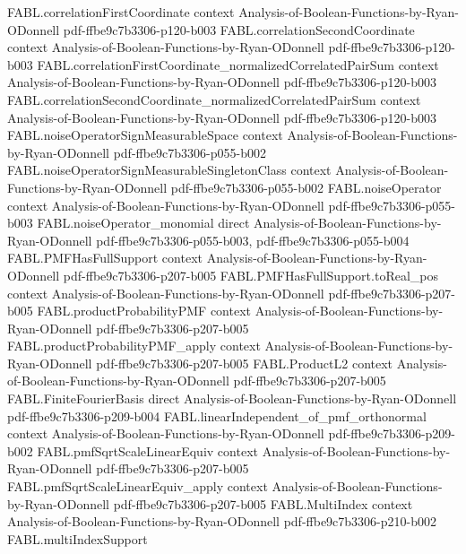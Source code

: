 \begin{theorem}
\proofstep
  {FABL.correlationFirstCoordinate}
  {context}
  {Analysis-of-Boolean-Functions-by-Ryan-ODonnell}
  {pdf-ffbe9c7b3306-p120-b003}
\proofstep
  {FABL.correlationSecondCoordinate}
  {context}
  {Analysis-of-Boolean-Functions-by-Ryan-ODonnell}
  {pdf-ffbe9c7b3306-p120-b003}
\proofstep
  {FABL.correlationFirstCoordinate_normalizedCorrelatedPairSum}
  {context}
  {Analysis-of-Boolean-Functions-by-Ryan-ODonnell}
  {pdf-ffbe9c7b3306-p120-b003}
\proofstep
  {FABL.correlationSecondCoordinate_normalizedCorrelatedPairSum}
  {context}
  {Analysis-of-Boolean-Functions-by-Ryan-ODonnell}
  {pdf-ffbe9c7b3306-p120-b003}
\proofstep
  {FABL.noiseOperatorSignMeasurableSpace}
  {context}
  {Analysis-of-Boolean-Functions-by-Ryan-ODonnell}
  {pdf-ffbe9c7b3306-p055-b002}
\proofstep
  {FABL.noiseOperatorSignMeasurableSingletonClass}
  {context}
  {Analysis-of-Boolean-Functions-by-Ryan-ODonnell}
  {pdf-ffbe9c7b3306-p055-b002}
\proofstep
  {FABL.noiseOperator}
  {context}
  {Analysis-of-Boolean-Functions-by-Ryan-ODonnell}
  {pdf-ffbe9c7b3306-p055-b003}
\proofstep
  {FABL.noiseOperator_monomial}
  {direct}
  {Analysis-of-Boolean-Functions-by-Ryan-ODonnell}
  {pdf-ffbe9c7b3306-p055-b003,
    pdf-ffbe9c7b3306-p055-b004}
\proofstep
  {FABL.PMFHasFullSupport}
  {context}
  {Analysis-of-Boolean-Functions-by-Ryan-ODonnell}
  {pdf-ffbe9c7b3306-p207-b005}
\proofstep
  {FABL.PMFHasFullSupport.toReal_pos}
  {context}
  {Analysis-of-Boolean-Functions-by-Ryan-ODonnell}
  {pdf-ffbe9c7b3306-p207-b005}
\proofstep
  {FABL.productProbabilityPMF}
  {context}
  {Analysis-of-Boolean-Functions-by-Ryan-ODonnell}
  {pdf-ffbe9c7b3306-p207-b005}
\proofstep
  {FABL.productProbabilityPMF_apply}
  {context}
  {Analysis-of-Boolean-Functions-by-Ryan-ODonnell}
  {pdf-ffbe9c7b3306-p207-b005}
\proofstep
  {FABL.ProductL2}
  {context}
  {Analysis-of-Boolean-Functions-by-Ryan-ODonnell}
  {pdf-ffbe9c7b3306-p207-b005}
\proofstep
  {FABL.FiniteFourierBasis}
  {direct}
  {Analysis-of-Boolean-Functions-by-Ryan-ODonnell}
  {pdf-ffbe9c7b3306-p209-b004}
\proofstep
  {FABL.linearIndependent_of_pmf_orthonormal}
  {context}
  {Analysis-of-Boolean-Functions-by-Ryan-ODonnell}
  {pdf-ffbe9c7b3306-p209-b002}
\proofstep
  {FABL.pmfSqrtScaleLinearEquiv}
  {context}
  {Analysis-of-Boolean-Functions-by-Ryan-ODonnell}
  {pdf-ffbe9c7b3306-p207-b005}
\proofstep
  {FABL.pmfSqrtScaleLinearEquiv_apply}
  {context}
  {Analysis-of-Boolean-Functions-by-Ryan-ODonnell}
  {pdf-ffbe9c7b3306-p207-b005}
\proofstep
  {FABL.MultiIndex}
  {context}
  {Analysis-of-Boolean-Functions-by-Ryan-ODonnell}
  {pdf-ffbe9c7b3306-p210-b002}
\proofstep
  {FABL.multiIndexSupport}

\end{theorem}
